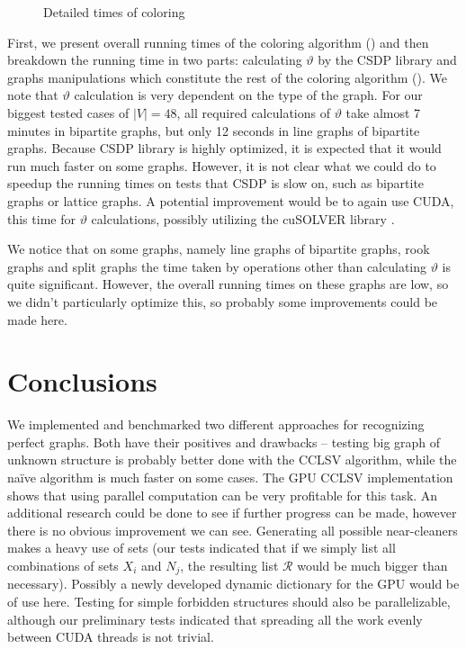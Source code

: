 \begin{figure}
  \centering
  
  \caption{Detailed times of coloring}
  \label{fig:CSDPDet}
\end{figure}

First, we present overall running times of the coloring algorithm () and then breakdown the running time in two parts: calculating $\vartheta$ by the CSDP library and graphs manipulations which constitute the rest of the coloring algorithm (). We note that $\vartheta$ calculation is very dependent on the type of the graph. For our biggest tested cases of $|V| = 48$, all required calculations of $\vartheta$ take almost 7 minutes in bipartite graphs, but only 12 seconds in line graphs of bipartite graphs. Because CSDP library is highly optimized, it is expected that it would run much faster on some graphs. However, it is not clear what we could do to speedup the running times on tests that CSDP is slow on, such as bipartite graphs or lattice graphs. A potential improvement would be to again use CUDA, this time for $\vartheta$ calculations, possibly utilizing the cuSOLVER library \cite{cusolver}.


We notice that on some graphs, namely line graphs of bipartite graphs, rook graphs and split graphs the time taken by operations other than calculating $\vartheta$ is quite significant. However, the overall running times on these graphs are low, so we didn't particularly optimize this, so probably some improvements could be made here.

\section{Conclusions}
We implemented and benchmarked two different approaches for recognizing perfect graphs. Both have their positives and drawbacks -- testing big graph of unknown structure is probably better done with the CCLSV algorithm, while the na\"ive algorithm is much faster on some cases. The GPU CCLSV implementation shows that using parallel computation can be very profitable for this task. An additional research could be done to see if further progress can be made, however there is no obvious improvement we can see. Generating all possible near-cleaners makes a heavy use of sets (our tests indicated that if we simply list all combinations of sets $X_i$ and $N_j$, the resulting list $\mathcal{R}$ would be much bigger than necessary). Possibly a newly developed dynamic dictionary for the GPU \cite{Ashkiani2018} would be of use here. Testing for simple forbidden structures should also be parallelizable, although our preliminary tests indicated that spreading all the work evenly between CUDA threads is not trivial.

